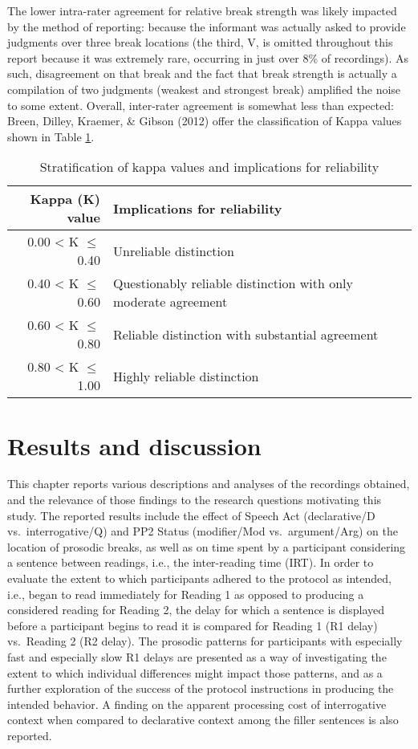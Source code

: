 \documentclass[11pt,oneside]{book}
\begin{document}
The lower intra-rater agreement for relative break strength was likely impacted by the method of reporting: because the informant was actually asked to provide judgments over three break locations (the third, V, is omitted throughout this report because it was extremely rare, occurring in just over 8\% of recordings). As such, disagreement on that break and the fact that break strength is actually a compilation of two judgments (weakest and strongest break) amplified the noise to some extent. Overall, inter-rater agreement is somewhat less than expected: Breen, Dilley, Kraemer, \& Gibson (2012) offer the classification of Kappa values shown in Table \ref{tab:agreements}.

\begin{table}[!h]

\caption{\label{tab:agreements}Stratification of kappa values and implications for reliability}
\centering
\begin{tabular}{rlrl}
\toprule
Kappa (K) value & Implications for reliability\\
\midrule
0.00 < K $\leq$ 0.40 & Unreliable distinction\\
0.40 < K $\leq$ 0.60 & Questionably reliable distinction with only moderate agreement\\
0.60 < K $\leq$ 0.80 & Reliable distinction with substantial agreement\\
0.80 < K $\leq$ 1.00 & Highly reliable distinction\\
\bottomrule
\end{tabular}
\end{table}

\hypertarget{res}{%
\chapter{Results and discussion}\label{res}}

This chapter reports various descriptions and analyses of the recordings obtained, and the relevance of those findings to the research questions motivating this study. The reported results include the effect of Speech Act (declarative/D vs.~interrogative/Q) and PP2 Status (modifier/Mod vs.~argument/Arg) on the location of prosodic breaks, as well as on time spent by a participant considering a sentence between readings, i.e., the inter-reading time (IRT). In order to evaluate the extent to which participants adhered to the protocol as intended, i.e., began to read immediately for Reading 1 as opposed to producing a considered reading for Reading 2, the delay for which a sentence is displayed before a participant begins to read it is compared for Reading 1 (R1 delay) vs.~Reading 2 (R2 delay). The prosodic patterns for participants with especially fast and especially slow R1 delays are presented as a way of investigating the extent to which individual differences might impact those patterns, and as a further exploration of the success of the protocol instructions in producing the intended behavior. A finding on the apparent processing cost of interrogative context when compared to declarative context among the filler sentences is also reported.
\end{document}
